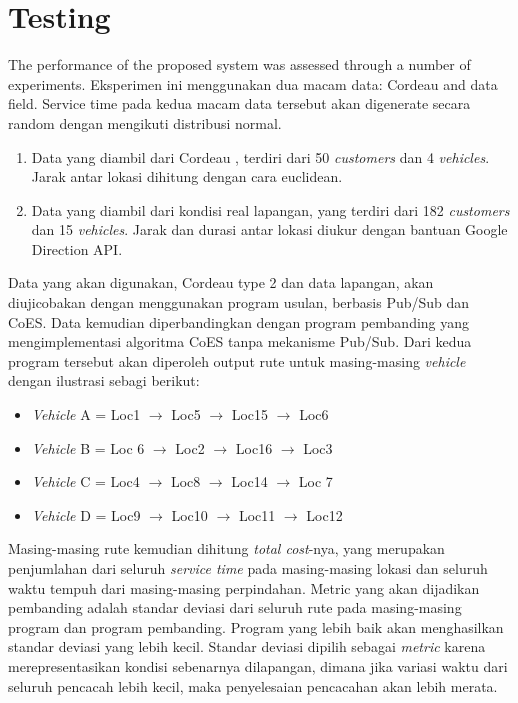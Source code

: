 \documentclass[conference]{IEEEtran}
\begin{document}
\section{Testing}
\label{sec:testing}
The performance of the proposed system was assessed through a number of experiments. Eksperimen ini menggunakan dua macam data: Cordeau and data field. Service time pada kedua macam data tersebut akan digenerate secara random dengan mengikuti distribusi normal.


\begin{enumerate}
\item Data yang diambil dari Cordeau \cite{cordeau_tabu_1997}, terdiri dari 50 \textit{customers} dan 4 \textit{vehicles}. Jarak antar lokasi dihitung dengan cara euclidean.
\item Data yang diambil dari kondisi real lapangan, yang terdiri dari 182 \textit{customers} dan 15 \textit{vehicles}. Jarak dan durasi antar lokasi diukur dengan bantuan Google Direction API.
\end{enumerate}


Data yang akan digunakan, Cordeau type 2 dan data lapangan, akan diujicobakan dengan menggunakan program usulan, berbasis Pub/Sub dan CoES. Data kemudian diperbandingkan dengan program pembanding yang mengimplementasi algoritma CoES tanpa mekanisme Pub/Sub. Dari kedua program tersebut akan diperoleh output rute untuk masing-masing \textit{vehicle} dengan ilustrasi sebagi berikut:

\begin{itemize}
\item \textit{Vehicle} A = Loc1 $\rightarrow$ Loc5 $\rightarrow$ Loc15 $\rightarrow$ Loc6
\item \textit{Vehicle} B = Loc 6 $\rightarrow$ Loc2 $\rightarrow$ Loc16 $\rightarrow$ Loc3
\item \textit{Vehicle} C = Loc4 $\rightarrow$ Loc8 $\rightarrow$ Loc14 $\rightarrow$ Loc 7
\item \textit{Vehicle} D = Loc9 $\rightarrow$ Loc10 $\rightarrow$ Loc11 $\rightarrow$ Loc12
\end{itemize}


Masing-masing rute kemudian dihitung \textit{total cost}-nya, yang merupakan penjumlahan dari seluruh \textit{service time} pada masing-masing lokasi dan seluruh waktu tempuh dari masing-masing perpindahan. Metric yang akan dijadikan pembanding adalah standar deviasi dari seluruh rute pada masing-masing program dan program pembanding. Program yang lebih baik akan menghasilkan standar deviasi yang lebih kecil. Standar deviasi dipilih sebagai \textit{metric} karena merepresentasikan kondisi sebenarnya dilapangan, dimana jika variasi waktu dari seluruh pencacah lebih kecil, maka penyelesaian pencacahan akan lebih merata.
\end{document}
